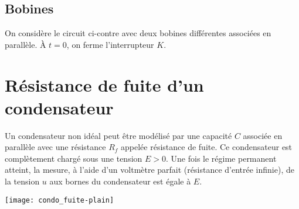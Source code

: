 \documentclass[a4paper, 12pt, final, garamond]{book}
\begin{document}
\subsection{Bobines}
\hfill
\begin{minipage}{\sujetUniquement{0.55}\siCorrige{1}\linewidth}
	On considère le circuit ci-contre avec deux bobines différentes
	associées en parallèle. À $t=0$, on ferme l'interrupteur $K$.
\end{minipage}


\resetQ
\section{Résistance de fuite d'un condensateur}

\begin{minipage}{0.5\linewidth}

	Un condensateur non idéal peut être modélisé par une capacité $C$ associée
	en parallèle avec une résistance $R_f$ appelée résistance de fuite. Ce
	condensateur est complètement chargé sous une tension $E > 0$. Une fois le
	régime permanent atteint, la mesure, à l'aide d’un voltmètre parfait
	(résistance d’entrée infinie), de la tension $u$ aux bornes du condensateur
	est égale à $E$.
\end{minipage}
\hfill
\begin{minipage}{0.45\linewidth}
	\begin{center}
		\texttt{[image: condo\_fuite-plain]}
	\end{center}
\end{minipage}
\end{document}

